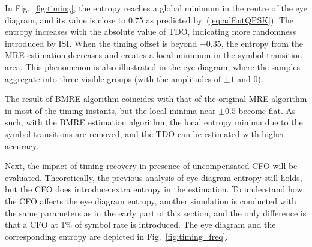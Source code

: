 \documentclass[12pt, draftclsnofoot, onecolumn]{IEEEtran}
\begin{document}
In Fig.~\ref{fig:timing}, the entropy reaches a global minimum in the centre of the eye diagram, and its value is close to 0.75 as predicted by~(\ref{eq:adEntQPSK}).
The entropy increases with the absolute value of TDO, indicating  more randomness introduced by ISI.
When the timing offset is beyond $\pm 0.35$, the  entropy from the MRE estimation decreases and creates a local minimum in the symbol transition area. 
This phenomenon is also illustrated in the eye diagram, where the samples aggregate into three visible groups (with the amplitudes of \(\pm 1\) and 0).

The result of BMRE algorithm coincides with that of the original MRE algorithm in most of the timing instants, but the local minima near $\pm0.5$ become flat.
As such, with the BMRE estimation algorithm, the local entropy minima due to the symbol transitions are removed, and the TDO can be estimated with higher accuracy.

Next, the impact of timing recovery in presence of uncompensated CFO will be evaluated.  
Theoretically, the previous analysis of eye diagram entropy still holds, but the CFO does introduce extra entropy in the estimation.
To understand how the CFO affects the eye diagram entropy, another simulation is conducted with the same parameters as in the early part of this section,
and the only difference is that a CFO at 1\% of symbol rate is introduced.
The eye diagram and the corresponding entropy are depicted in Fig.~\ref{fig:timing_freq}.
      
\end{document}
